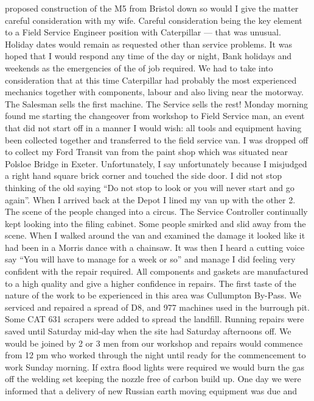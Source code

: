 proposed construction of the M5 from Bristol down so would I give the matter
careful consideration with my wife.  Careful consideration being the key
element to a Field Service Engineer position with Caterpillar --- that was
unusual.  Holiday dates would remain as requested other than service problems.
It was hoped that I would respond any time of the day or night, Bank holidays
and weekends as the emergencies of the of job required.  We had to take into
consideration that at this time Caterpillar had probably the most experienced
mechanics together with components, labour and also living near the motorway.
The Salesman sells the first machine.  The Service sells the rest!  Monday
morning found me starting the changeover from workshop to Field Service man, an
event that did not start off in a manner I would wish:  all tools and equipment
having been collected together and transferred to the field service van. I was
dropped off to collect my Ford Transit van from the paint shop which was
situated near Polsloe Bridge in Exeter.  Unfortunately, I say unfortunately
because I misjudged a right hand square brick corner and touched the side door.
I did not stop thinking of the old saying ``Do not stop to look or you will
never start and go again''.  When I arrived back at the Depot I lined my van up
with the other 2.  The scene of the people changed into a circus.  The Service
Controller continually kept looking into the filing cabinet.  Some people
smirked and slid away from the scene.  When I walked around the van and
examined the damage it looked like it had been in a Morris dance with a
chainsaw.  It was then I heard a cutting voice say ``You will have to manage
for a week or so'' and manage I did feeling very confident with the repair
required.   All components and gaskets are manufactured to a high quality and
give a higher confidence in repairs. The first taste of the nature of the work
to be experienced in this area was Cullumpton By-Pass.  We serviced and
repaired a spread of D8, and 977 machines used in the burrough             pit.
Some CAT 631 scrapers were added to spread the landfill.   Running repairs were
saved until Saturday mid-day when the site had Saturday afternoons off.  We
would be joined by 2 or 3 men from our workshop and repairs would commence from
12 pm who worked through the night until ready for the commencement to work
Sunday morning.   If extra flood lights were required  we would burn the gas
off the welding set keeping the nozzle free of carbon build up.  One day we
were informed that a delivery of new Russian earth moving equipment was due and
